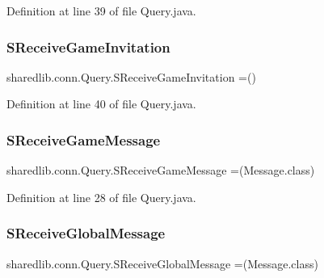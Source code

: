 Definition at line 39 of file Query.\+java.

\hypertarget{enumsharedlib_1_1conn_1_1_query_ab360a0406c246d18e767e4768362621a}{}\label{enumsharedlib_1_1conn_1_1_query_ab360a0406c246d18e767e4768362621a} 
\subsubsection{\texorpdfstring{S\+Receive\+Game\+Invitation}{SReceiveGameInvitation}}
{\footnotesize\ttfamily sharedlib.\+conn.\+Query.\+S\+Receive\+Game\+Invitation =()}



Definition at line 40 of file Query.\+java.

\hypertarget{enumsharedlib_1_1conn_1_1_query_a34ddcc74f8326d320a4cffedc2f9a647}{}\label{enumsharedlib_1_1conn_1_1_query_a34ddcc74f8326d320a4cffedc2f9a647} 
\subsubsection{\texorpdfstring{S\+Receive\+Game\+Message}{SReceiveGameMessage}}
{\footnotesize\ttfamily sharedlib.\+conn.\+Query.\+S\+Receive\+Game\+Message =(Message.\+class)}



Definition at line 28 of file Query.\+java.

\hypertarget{enumsharedlib_1_1conn_1_1_query_a76fcfb3d9ac59f2ed513e76d324b4c88}{}\label{enumsharedlib_1_1conn_1_1_query_a76fcfb3d9ac59f2ed513e76d324b4c88} 
\subsubsection{\texorpdfstring{S\+Receive\+Global\+Message}{SReceiveGlobalMessage}}
{\footnotesize\ttfamily sharedlib.\+conn.\+Query.\+S\+Receive\+Global\+Message =(Message.\+class)}



